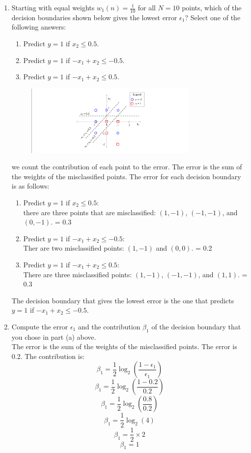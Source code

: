 \documentclass[a3paper,12pt]{extarticle} %
\begin{document}
\begin{enumerate}
    \item  Starting with equal weights $w_1(n) = \frac{1}{10}$ for all $N = 10$ points, which of the decision boundaries shown below gives the lowest error $\epsilon_1$? Select one of the following answers:

\begin{enumerate}
    \item Predict $y = 1$ if $x_2 \leq 0.5$.
    \item  Predict $y = 1$ if $-x_1 + x_2 \leq -0.5$.
    \item  Predict $y = 1$ if $-x_1 + x_2 \leq 0.5$.
\end{enumerate}

\begin{figure}[h]
    \centering
    \includegraphics[width=0.8\textwidth]{adaboost2.png}
    \label{fig:primal}
\end{figure}
we count the contribution of each point to the error. The error is the sum of the weights of the misclassified points. The error for each decision boundary is as follows:
\begin{enumerate}
    \item Predict $y = 1$ if $x_2 \leq 0.5$:
    \\ there are three points that are misclassified: $(1, -1)$, $(-1, -1)$, and $(0, -1)$. = 0.3
    \item Predict $y = 1$ if $-x_1 + x_2 \leq -0.5$:
    \\  Ther are two misclassified points: $(1, -1)$ and $(0, 0)$. = 0.2
    \item Predict $y = 1$ if $-x_1 + x_2 \leq 0.5$:
    \\ There are three misclassified points: $(1, -1)$, $(-1, -1)$, and $(1, 1)$. = 0.3
\end{enumerate}
The decision boundary that gives the lowest error is the one that predicts $y = 1$ if $-x_1 + x_2 \leq -0.5$.
    \item Compute the error $\epsilon_1$ and the contribution $\beta_1$ of the decision boundary that you chose in part (a) above.
    \\ The error is the sum of the weights of the misclassified points. The error is 0.2. The contribution is:
    \[
    \beta_1 = \frac{1}{2} \log_2\left(\frac{1 - \epsilon_1}{\epsilon_1}\right)
    \]
    \[
    \beta_1 = \frac{1}{2} \log_2\left(\frac{1 - 0.2}{0.2}\right)
    \]
    \[
    \beta_1 = \frac{1}{2} \log_2\left(\frac{0.8}{0.2}\right)
    \]
    \[
    \beta_1 = \frac{1}{2} \log_2\left(4\right)
    \]
    \[
    \beta_1 = \frac{1}{2} \times 2
    \]
    \[
    \beta_1 = 1
    \]


\end{enumerate}
\end{document}
